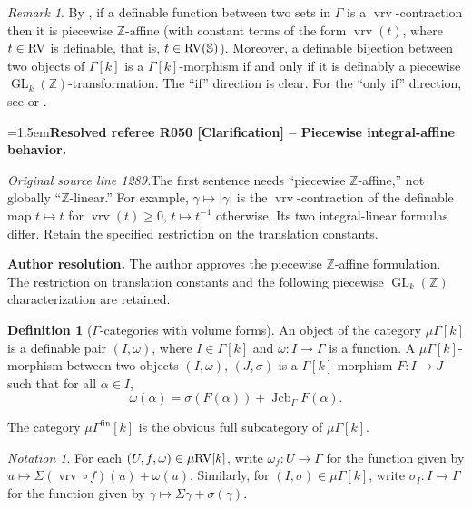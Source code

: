 \documentclass[12pt]{amsart}
\newcommand{\ResolvedRefereeRemark}[5]{%
  \par\medskip\begingroup\normalfont\small\color{gray}%
  \emergencystretch=1.5em\noindent\textbf{Resolved referee R#1 [#2] -- #3.}\par\nobreak\noindent #4\par
  \medskip\color{ResolutionGreen}\noindent\textbf{Author resolution.} #5\par
  \endgroup\medskip
}
\theoremstyle{plain}
\theoremstyle{definition}
\newtheorem{defn}[thm]{Definition}
\theoremstyle{remark}
\newtheorem{rem}[thm]{Remark}
\newtheorem{nota}[thm]{Notation}
\numberwithin{equation}{section}
\theoremstyle{plain}
\newcommand{\RV}{\textup{RV}}
\DeclareMathOperator{\mgl}{GL}
\DeclareMathOperator{\jcb}{Jcb}
\newcommand{\Z}{\mathds{Z}}
\newcommand{\0}{\emptyset}
\newcommand{\fun}{\longrightarrow}
\newcommand{\efun}{\longmapsto}
\newcommand{\mgRV}{{\mu}{\RV}}
\newcommand{\mG}{{\mu}{\Gamma}}
\DeclareMathOperator{\fin}{fin}
\DeclareMathOperator{\vrv}{vrv}
\begin{document}
\begin{rem}\label{GLZ:char}
By \cite[Remark~2.28]{Yin:int:expan:acvf}, if a definable function between two sets in $\Gamma$ is a $\vrv$-contraction then it is piecewise $\Z$-affine (with constant terms of the form $\vrv(t)$, where $t \in \RV$ is definable, that is, $t \in \RV(\mathbb{S})$). Moreover,  a definable bijection  between two objects of $\Gamma[k]$ is a  $\Gamma[k]$-morphism if and only if it is definably a piecewise $\mgl_k(\Z)$-transformation. The ``if'' direction is clear. For the ``only if'' direction, see \cite[Lemma~10.1]{hrushovski:kazhdan:integration:vf} or \cite[Lemma~2.29]{Yin:int:expan:acvf}.

\ResolvedRefereeRemark{050}{Clarification}{Piecewise integral-affine behavior}{%
\textit{Original source line 1289.}\quad The first sentence needs ``piecewise $\mathbb Z$-affine,'' not globally ``$\mathbb Z$-linear.'' For example, $\gamma\mapsto |\gamma|$ is the $\vrv$-contraction of the definable map $t\mapsto t$ for $\vrv(t)\geq0$, $t\mapsto t^{-1}$ otherwise. Its two integral-linear formulas differ. Retain the specified restriction on the translation constants.
}{The author approves the piecewise $\Z$-affine formulation. The restriction on translation constants and the following piecewise $\mgl_k(\Z)$ characterization are retained.}
\end{rem}


\begin{defn}[$\Gamma$-categories with volume forms]\label{def:Ga:cat:mu}
An object of the category $\mG[k]$ is a definable pair $(I, \omega)$, where $I \in \Gamma[k]$ and $\omega : I \fun \Gamma$ is a function. A $\mG[k]$-morphism between two objects $(I, \omega)$, $(J, \sigma)$ is a $\Gamma[k]$-morphism $F : I \fun J$ such that for all $\alpha  \in I$,
\[
\omega(\alpha) = \sigma(F(\alpha)) + \jcb_{\Gamma} F(\alpha).
\]

The category $\mG^{\fin}[k]$ is the obvious full subcategory of $\mG[k]$.
\end{defn}

\begin{nota}\label{comp:form}
For each $(U, f, \omega) \in \mgRV[k]$, write $\omega_f : U \fun \Gamma$ for the function given by $u \efun \Sigma(\vrv \circ f)(u) + \omega(u)$. Similarly, for $(I, \sigma) \in \mG[k]$, write $\sigma_I : I \fun \Gamma$ for the function given by $\gamma \efun \Sigma \gamma + \sigma(\gamma)$.
\end{nota}
\end{document}
